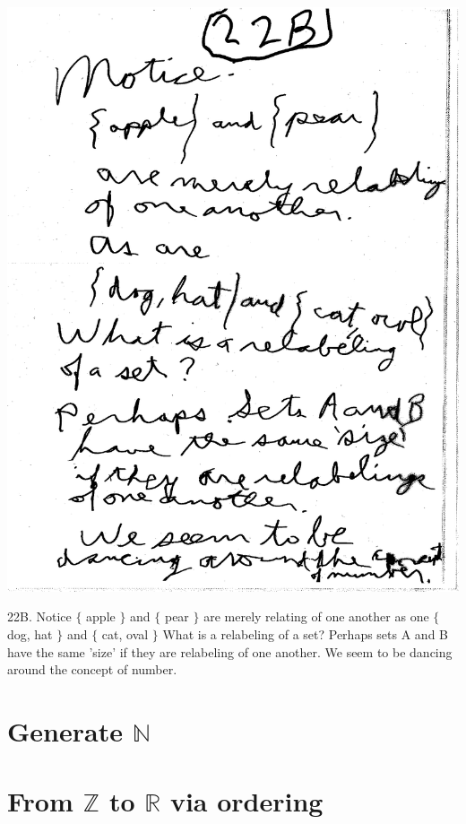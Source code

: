 \documentclass[10pt,a4paper]{article}
\begin{document}
\includegraphics[scale=.5]{Pages/Page_22B}

22B. Notice $\{$ apple $\}$ and $\{$ pear $\}$ are merely relating of one another as one $\{$ dog, hat $\}$ and $\{$ cat, oval $\}$ What is a relabeling of a set? Perhaps sets A and B have the same 'size' if they are relabeling of one another. We seem to be dancing around the concept of number. 

\section{Generate $\mathbb{N}$}






\section{From $\mathbb{Z}$ to $\mathbb{R}$ via ordering}

\end{document}
